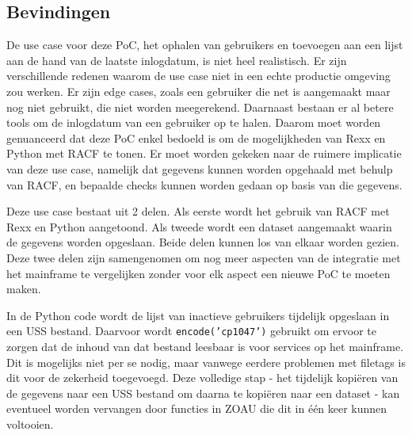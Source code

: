 \subsection{Bevindingen}
De use case voor deze PoC, het ophalen van gebruikers en toevoegen aan een lijst aan de hand van de laatste inlogdatum, is niet heel realistisch. Er zijn verschillende redenen waarom de use case niet in een echte productie omgeving zou werken. Er zijn edge cases, zoals een gebruiker die net is aangemaakt maar nog niet gebruikt, die niet worden meegerekend. Daarnaast bestaan er al betere tools om de inlogdatum van een gebruiker op te halen. Daarom moet worden genuanceerd dat deze PoC enkel bedoeld is om de mogelijkheden van Rexx en Python met RACF te tonen. Er moet worden gekeken naar de ruimere implicatie van deze use case, namelijk dat gegevens kunnen worden opgehaald met behulp van RACF, en bepaalde checks kunnen worden gedaan op basis van die gegevens.

Deze use case bestaat uit 2 delen. Als eerste wordt het gebruik van RACF met Rexx en Python aangetoond. Als tweede wordt een dataset aangemaakt waarin de gegevens worden opgeslaan. Beide delen kunnen los van elkaar worden gezien. Deze twee delen zijn samengenomen om nog meer aspecten van de integratie met het mainframe te vergelijken zonder voor elk aspect een nieuwe PoC te moeten maken.

In de Python code wordt de lijst van inactieve gebruikers tijdelijk opgeslaan in een USS bestand. Daarvoor wordt \texttt{encode('cp1047')} gebruikt om ervoor te zorgen dat de inhoud van dat bestand leesbaar is voor services op het mainframe. Dit is mogelijks niet per se nodig, maar vanwege eerdere problemen met filetags is dit voor de zekerheid toegevoegd. Deze volledige stap - het tijdelijk kopiëren van de gegevens naar een USS bestand om daarna te kopiëren naar een dataset - kan eventueel worden vervangen door functies in ZOAU die dit in één keer kunnen voltooien.

